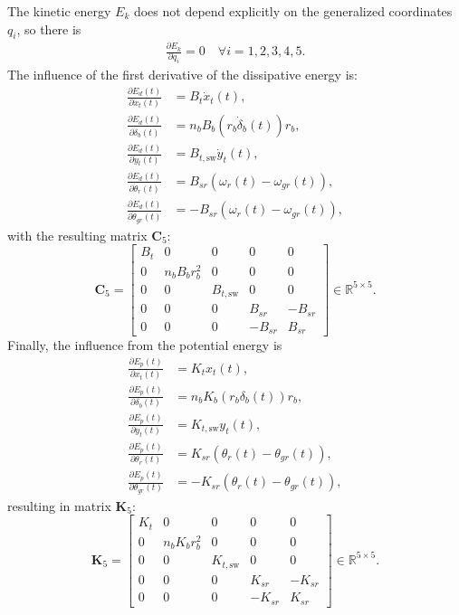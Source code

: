 %
The kinetic energy $E_k$ does not depend explicitly on the generalized coordinates $q_i$, so there is
\begin{align*}
    \frac{\partial E_k}{\partial q_i }= 0\quad \forall i = 1, 2, 3, 4, 5.
\end{align*}
The influence of the first derivative of the dissipative energy is:
\begin{align*}
    \frac{\partial E_d(t)}{\partial \dot{x}_t(t) } &= B_t \dot{x}_t(t), \\
    \frac{\partial E_d(t)}{\partial \dot{\delta}_b(t) } &= n_b B_b(r_b \dot{\delta}_b(t)) r_b, \\
    \frac{\partial E_d(t)}{\partial \dot{y}_t(t) } &= B_{t,\text{sw}} \dot{y}_t(t), \\
    \frac{\partial E_d(t)}{\partial \dot{\theta}_r(t) } &= B_{sr}(\omega_r(t) - \omega_{gr}(t)), \\
    \frac{\partial E_d(t)}{\partial \dot{\theta}_{gr}(t) } &= -B_{sr}(\omega_r(t) - \omega_{gr}(t)),
\end{align*}
with the resulting matrix \( \mathbf{C}_5 \):
\[
\mathbf{C}_5 = \begin{bmatrix}
    B_t & 0 & 0 & 0 & 0 \\
    0 & n_b B_b r_b^2 & 0 & 0 & 0 \\
    0 & 0 & B_{t,\text{sw}} & 0 & 0 \\
    0 & 0 & 0 & B_{sr} & -B_{sr} \\
    0 & 0 & 0 & -B_{sr} & B_{sr}
\end{bmatrix}  \in \mathbb{R}^{5 \times 5}.
\]
%   
Finally, the influence from the potential energy is
\begin{align*}
    \frac{\partial E_p(t)}{\partial x_t(t) } &= K_t x_t(t), \\
    \frac{\partial E_p(t)}{\partial \delta_b(t) } &= n_b K_b(r_b \delta_b(t)) r_b, \\
    \frac{\partial E_p(t)}{\partial y_t(t) } &= K_{t,\text{sw}} y_t(t), \\
    \frac{\partial E_p(t)}{\partial \theta_r(t) } &= K_{sr}(\theta_r(t) - \theta_{gr}(t)), \\
    \frac{\partial E_p(t)}{\partial \theta_{gr}(t) } &= -K_{sr}(\theta_r(t) - \theta_{gr}(t)),
\end{align*}
resulting in matrix \(\mathbf{K}_5\):
\[
\mathbf{K}_5 = \begin{bmatrix}
    K_t & 0 & 0 & 0 & 0 \\
    0 & n_b K_b r_b^2 & 0 & 0 & 0 \\
    0 & 0 & K_{t,\text{sw}} & 0 & 0 \\
    0 & 0 & 0 & K_{sr} & -K_{sr} \\
    0 & 0 & 0 & -K_{sr} & K_{sr}
\end{bmatrix}  \in \mathbb{R}^{5 \times 5}.
\]
